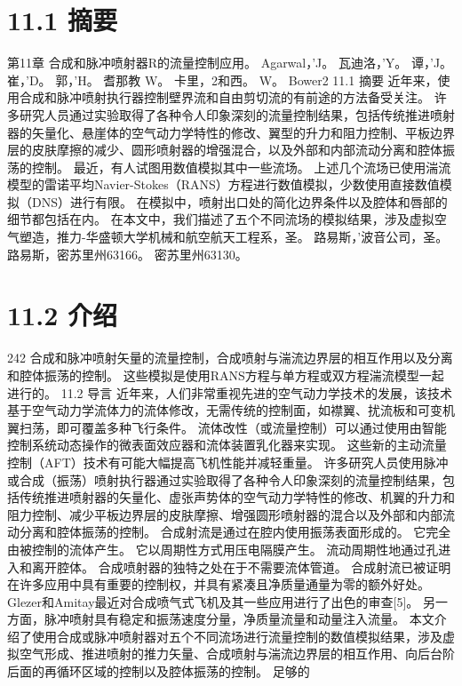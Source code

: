 \documentclass[UTF8,11pt,a4paper,openany,fontset=fandol]{ctexbook}
\begin{document}
\section{11.1 摘要}
第11章 合成和脉冲喷射器R的流量控制应用。 Agarwal，'J。 瓦迪洛，'Y。 谭，'J。 崔，'D。 郭，'H。 耆那教 W。 卡里，2和西。 W。 Bower2 11.1 摘要 近年来，使用合成和脉冲喷射执行器控制壁界流和自由剪切流的有前途的方法备受关注。 许多研究人员通过实验取得了各种令人印象深刻的流量控制结果，包括传统推进喷射器的矢量化、悬崖体的空气动力学特性的修改、翼型的升力和阻力控制、平板边界层的皮肤摩擦的减少、圆形喷射器的增强混合，以及外部和内部流动分离和腔体振荡的控制。 最近，有人试图用数值模拟其中一些流场。 上述几个流场已使用湍流模型的雷诺平均Navier-Stokes（RANS）方程进行数值模拟，少数使用直接数值模拟（DNS）进行有限。 在模拟中，喷射出口处的简化边界条件以及腔体和唇部的细节都包括在内。 在本文中，我们描述了五个不同流场的模拟结果，涉及虚拟空气塑造，推力-华盛顿大学机械和航空航天工程系，圣。 路易斯，'波音公司，圣。 路易斯，密苏里州63166。 密苏里州63130。

\section{11.2 介绍}
242 合成和脉冲喷射矢量的流量控制，合成喷射与湍流边界层的相互作用以及分离和腔体振荡的控制。 这些模拟是使用RANS方程与单方程或双方程湍流模型一起进行的。 11.2 导言 近年来，人们非常重视先进的空气动力学技术的发展，该技术基于空气动力学流体力的流体修改，无需传统的控制面，如襟翼、扰流板和可变机翼扫荡，即可覆盖多种飞行条件。 流体改性（或流量控制）可以通过使用由智能控制系统动态操作的微表面效应器和流体装置乳化器来实现。 这些新的主动流量控制（AFT）技术有可能大幅提高飞机性能并减轻重量。 许多研究人员使用脉冲或合成（振荡）喷射执行器通过实验取得了各种令人印象深刻的流量控制结果，包括传统推进喷射器的矢量化、虚张声势体的空气动力学特性的修改、机翼的升力和阻力控制、减少平板边界层的皮肤摩擦、增强圆形喷射器的混合以及外部和内部流动分离和腔体振荡的控制。 合成射流是通过在腔内使用振荡表面形成的。 它完全由被控制的流体产生。 它以周期性方式用压电隔膜产生。 流动周期性地通过孔进入和离开腔体。 合成喷射器的独特之处在于不需要流体管道。 合成射流已被证明在许多应用中具有重要的控制权，并具有紧凑且净质量通量为零的额外好处。 Glezer和Amitay最近对合成喷气式飞机及其一些应用进行了出色的审查[5]。 另一方面，脉冲喷射具有稳定和振荡速度分量，净质量流量和动量注入流量。 本文介绍了使用合成或脉冲喷射器对五个不同流场进行流量控制的数值模拟结果，涉及虚拟空气形成、推进喷射的推力矢量、合成喷射与湍流边界层的相互作用、向后台阶后面的再循环区域的控制以及腔体振荡的控制。 足够的
\end{document}
